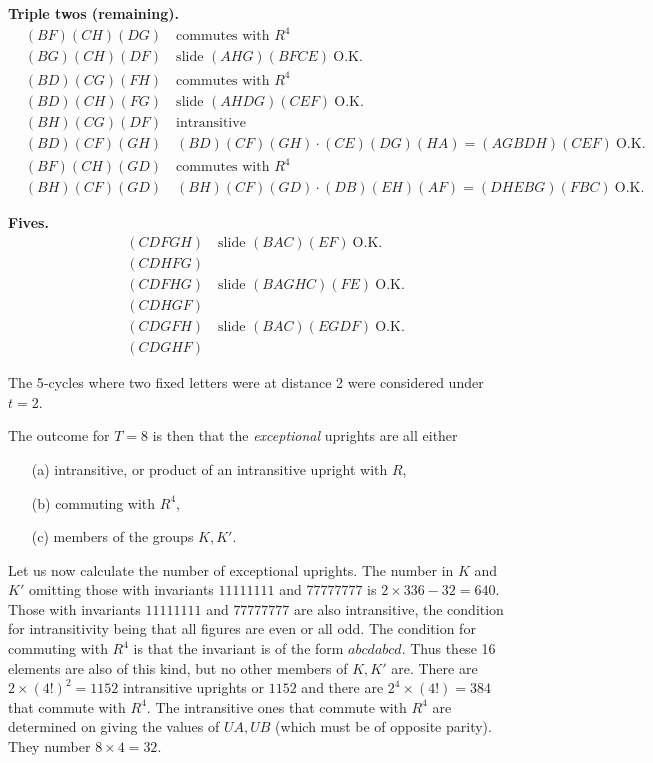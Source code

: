 \documentclass[12pt]{article}
\begin{document}
\noindent
{\bf Triple twos (remaining).}
\[
\begin{aligned}
&(BF)(CH)(DG)\quad \text{commutes with }R^4\\
&(BG)(CH)(DF)\quad \text{slide }(AHG)(BFCE)\ \text{O.K.}\\
&(BD)(CG)(FH)\quad \text{commutes with }R^4\\
&(BD)(CH)(FG)\quad \text{slide }(AHDG)(CEF)\ \text{O.K.}\\
&(BH)(CG)(DF)\quad \text{intransitive}\\
&(BD)(CF)(GH)\quad (BD)(CF)(GH)\cdot(CE)(DG)(HA)=(AGBDH)(CEF)\ \text{O.K.}\\
&(BF)(CH)(GD)\quad \text{commutes with }R^4\\
&(BH)(CF)(GD)\quad (BH)(CF)(GD)\cdot(DB)(EH)(AF)=(DHEBG)(FBC)\ \text{O.K.}
\end{aligned}
\]

\noindent
{\bf Fives.}
\[
\begin{aligned}
&(CDFGH)\quad \text{slide }(BAC)(EF)\ \text{O.K.}\\
&(CDHFG)\quad \\
&(CDFHG)\quad \text{slide }(BAGHC)(FE)\ \text{O.K.}\\
&(CDHGF)\quad \\
&(CDGFH)\quad \text{slide }(BAC)(EGDF)\ \text{O.K.}\\
&(CDGHF)\quad
\end{aligned}
\]

The 5‐cycles where two fixed letters were at distance 2 were considered under $t=2$.

\medskip

The outcome for $T=8$ is then that the {\em exceptional} uprights are all either
\begin{enumerate}
\item[(a)] intransitive, or product of an intransitive upright with $R$,
\item[(b)] commuting with $R^4$,
\item[(c)] members of the groups $K, K'$.
\end{enumerate}

Let us now calculate the number of exceptional uprights. The number in $K$ and $K'$ omitting those with invariants $11111111$ and $77777777$ is $2\times336-32=640.$ Those with invariants $11111111$ and $77777777$ are also intransitive, the condition for intransitivity being that all figures are even or all odd. The condition for commuting with $R^4$ is that the invariant is of the form $abcdabcd.$ Thus these 16 elements are also of this kind, but no other members of $K,K'$ are. There are $2\times(4!)^2=1152$ intransitive uprights or $1152$ and there are $2^4 \times(4!)=384$ that commute with $R^4.$ The intransitive ones that commute with $R^4$ are determined on giving the values of $UA, UB$ (which must be of opposite parity). They number $8\times4=32.$
\end{document}
